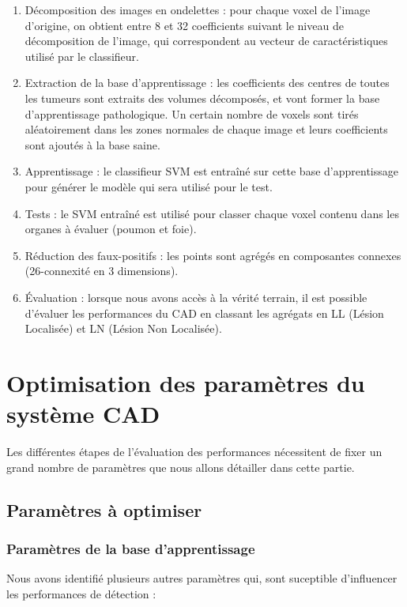 \begin{enumerate}
 \item Décomposition des images en ondelettes : pour chaque voxel de l'image d'origine, on obtient entre 8 et 32 coefficients suivant le niveau de décomposition de l'image, qui correspondent au vecteur de caractéristiques utilisé par le classifieur.
 \item Extraction de la base d'apprentissage : les coefficients des centres de toutes les tumeurs sont extraits des volumes décomposés, et vont former la base d'apprentissage pathologique. Un certain nombre de voxels sont tirés aléatoirement dans les zones normales de chaque image et leurs coefficients sont ajoutés à la base saine.
 \item Apprentissage : le classifieur SVM est entraîné sur cette base d'apprentissage pour générer le modèle qui sera utilisé pour le test.
 \item Tests : le SVM entraîné est utilisé pour classer chaque voxel contenu dans les organes à évaluer (poumon et foie).
 \item Réduction des faux-positifs : les points sont agrégés en composantes connexes (26-connexité en 3 dimensions).
 \item Évaluation : lorsque nous avons accès à la vérité terrain, il est possible d'évaluer les performances du CAD en classant les agrégats en LL (Lésion Localisée) et LN (Lésion Non Localisée).
\end{enumerate}



\section{Optimisation des paramètres du système CAD} %
\label{lab:optim}

Les différentes étapes de l'évaluation des performances nécessitent de fixer un grand nombre de paramètres que nous allons détailler dans cette partie.

\subsection{Paramètres à optimiser} %
\label{lab:optimParametres}

\subsubsection{Paramètres de la base d'apprentissage}

Nous avons identifié plusieurs autres paramètres qui, sont suceptible d'influencer les performances de détection :

